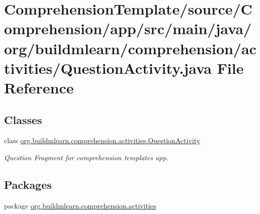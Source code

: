 \hypertarget{ComprehensionTemplate_2source_2Comprehension_2app_2src_2main_2java_2org_2buildmlearn_2comprehenscfbf808cb7256d3d0d88c3247345f7d9}{}\section{Comprehension\+Template/source/\+Comprehension/app/src/main/java/org/buildmlearn/comprehension/activities/\+Question\+Activity.java File Reference}
\label{ComprehensionTemplate_2source_2Comprehension_2app_2src_2main_2java_2org_2buildmlearn_2comprehenscfbf808cb7256d3d0d88c3247345f7d9}
\subsection*{Classes}
\begin{DoxyCompactItemize}
\item 
class \hyperlink{classorg_1_1buildmlearn_1_1comprehension_1_1activities_1_1QuestionActivity}{org.\+buildmlearn.\+comprehension.\+activities.\+Question\+Activity}
\begin{DoxyCompactList}\small\item\em Question Fragment for comprehension template\textquotesingle{}s app. \end{DoxyCompactList}\end{DoxyCompactItemize}
\subsection*{Packages}
\begin{DoxyCompactItemize}
\item 
package \hyperlink{namespaceorg_1_1buildmlearn_1_1comprehension_1_1activities}{org.\+buildmlearn.\+comprehension.\+activities}
\end{DoxyCompactItemize}

